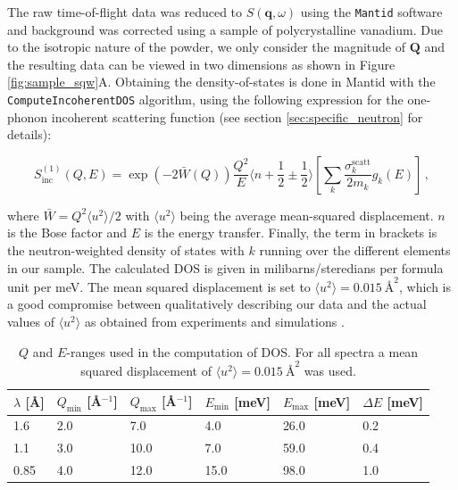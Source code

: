 The raw time-of-flight data was reduced to $S(\bm{q},\omega)$ using the \texttt{Mantid} \cite{Arnold2014} software and background was corrected using a sample of polycrystalline vanadium. Due to the isotropic nature of the powder, we only consider the magnitude of $\bm{Q}$ and the resulting data can be viewed in two dimensions as shown in Figure \ref{fig:sample_sqw}A. Obtaining the density-of-states is done in Mantid with the \texttt{ComputeIncoherentDOS} \cite{mantid_dos} algorithm, using the following expression for the one-phonon incoherent scattering function (see section \ref{sec:specific_neutron} for details):

 \[ S^{(1)}_{\mathrm{inc}}(Q,E) = \exp\left(-2\bar{W}(Q)\right) \frac{Q^2}{E} \langle n+\frac{1}{2}\pm\frac{1}{2} \rangle \left[ \sum_k \frac{\sigma_k^{\mathrm{scatt}}}{2m_k} g_k(E) \right]\, , \]
 
 \noindent where $\bar{W} = Q^2 \langle u^2 \rangle / 2$ with $\langle u^2 \rangle$ being the average mean-squared displacement. $n$ is the Bose factor and $E$ is the energy transfer. Finally, the term in brackets is the neutron-weighted density of states with $k$ running over the different elements in our sample. The calculated DOS is given in milibarns/steredians per formula unit per meV. The mean squared displacement is set to $\langle u^2 \rangle = \SI{0.015}{\angstrom\squared}$, which is a good compromise between qualitatively describing our data and the actual values of $\langle u^2 \rangle$ as obtained from experiments \cite{Hafliger2014} and simulations .
 
 \begin{table}
    \caption[IN4: $Q$ and $E$ windows for DOS integration]{$Q$ and $E$-ranges used in the computation of DOS. For all spectra a mean squared displacement of $\langle u^2 \rangle = \SI{0.015}{\angstrom\squared}$ was used.}
    \label{tab:qeranges}
    \centering
    \begin{tabular}{llllll}
    \toprule
    $\lambda$ [\AA] & $Q_\text{min}$ [\AA$^{-1}$] & $Q_\text{max}$ [\AA$^{-1}$] & $E_\text{min}$ [meV] & $E_\text{max}$ [meV] & $\Delta E$ [meV] \\ \midrule
    1.6             & 2.0                         & 7.0                         & 4.0                  & 26.0                 & 0.2              \\
    1.1             & 3.0                         & 10.0                        & 7.0                  & 59.0                 & 0.4              \\
    0.85            & 4.0                         & 12.0                        & 15.0                 & 98.0                 & 1.0              \\ \bottomrule
    \end{tabular}
 \end{table}

